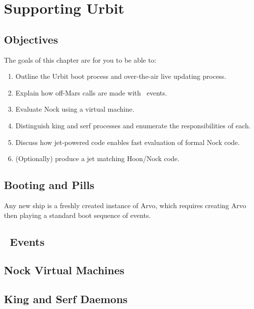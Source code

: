 \setchapterpreamble[u]{\margintoc}
\chapter{Supporting Urbit}

\section{Objectives}

The goals of this chapter are for you to be able to:

\begin{enumerate}
  \item  Outline the Urbit boot process and over-the-air live updating process.
  \item  Explain how off-Mars calls are made with \unix~events.
  \item  Evaluate Nock using a virtual machine.
  \item  Distinguish king and serf processes and enumerate the responsibilities of each.
  \item  Discuss how jet-powered code enables fast evaluation of formal Nock code.
  \item  (Optionally) produce a jet matching Hoon/Nock code.
\end{enumerate}


\section{Booting and Pills}

Any new ship is a freshly created instance of Arvo, which requires creating Arvo then playing a standard boot sequence of events.

\section{\unix~Events}

\section{Nock Virtual Machines}

\subsection{\mock}

\section{King and Serf Daemons}

